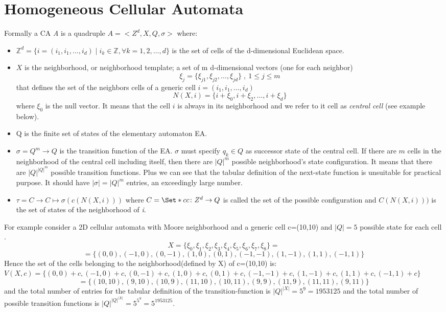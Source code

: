 \section{Homogeneous Cellular Automata}\label{homogeneousCellularAutomata}
Formally a CA \emph{A} is a quadruple $ A=<Z^d,X,Q,\sigma>$
where:
\begin{itemize}
  \item $\mathbb{Z}^d=\{i=(i_1,i_1,\ldots,i_d)\mid i_k \in
  \mathbb{Z}, \forall k=1,2,\ldots,d \}$ is the set of cells of the d-dimensional
   Euclidean space.
  \item $X$ is the neighborhood, or neighborhood template; a
  set of m d-dimensional vectors (one for each neighbor)
  \[\xi_j=\{\xi_{j1},\xi_{j2},\ldots,\xi_{jd}\} \;,\: 1\leq j \leq m\] that
  defines the set of the neighbors cells of a generic cell
  $i=(i_1,i_1,\ldots,i_d)$
  \[
  N(X,i)=\{i+\xi_0,i+\xi_2,\ldots,i+\xi_d\}
  \] where $\xi_0$ is the null vector. It means that the
  cell $i$ is always in its neighborhood and we refer to it
  cell as \emph{central cell}  (see example below).
\item Q is the finite set of states of the elementary automaton EA.
  
  \item $\sigma=Q^m \rightarrow Q $ is the transition
  function of the EA. $\sigma$ must specify
  $q_k \in Q $ as successor  state of the central cell.
  If there are $m$ cells in the neighborhood of the central
  cell including itself, then there are
  ${\left\vert{Q}\right\vert}^m$ possible neighborhood's
  state configuration. It  means that there are
  ${\left\vert{Q}\right\vert}^{{\left\vert{Q}\right\vert}^m}$
  possible transition functions. Plus we can see that the tabular definition of
  the next-state function is unsuitable for practical purpose. It should have
  $\left\vert{\sigma}\right\vert={\left\vert{Q}\right\vert}^m$
  entries, an exceedingly large number.
  \item $\tau=C \longrightarrow C \longmapsto
  \sigma(c(N(X,i)))$ where $C=\Set*{c}{c \colon Z^d
  \rightarrow Q}$ is called the set of the possible configuration and 
  $
  C(N(X,i)))$ is the set of states of the neighborhood of \textit{i}.
\end{itemize}




For example consider a 2D cellular automata with Moore neighborhood and a
generic cell c=(10,10) and ${\left\vert{Q}\right\vert}=5$
possible state for each cell .
\[X=\{\xi_{0},\xi_{1},\xi_{2},\xi_{3},\xi_{4},\xi_{5},\xi_{6},\xi_{7},\xi_{8}\}
=\]\[=\{(0,0),(-1,0),(0,-1),(1,0),(0,1),(-1,-1),(1,-1),(1,1),(-1,1)\}
\]
Hence the set of the cells belonging to the neighborhood(defined by X) of
c=(10,10) is:
$V(X,c)=\{(0,0)+c,(-1,0)+c,(0,-1)+c,(1,0)+c,(0,1)+c,(-1,-1)+c,(1,-1)+c,(1,1)+c,(-1,1)+c\}
$ 
\[=\{(10,10),(9,10),(10,9),(11,10),(10,11),(9,9),(11,9),(11,11),(9,11)\}
\]
and the total number of entries for the tabular definition of the
transition-function is  ${\left\vert{Q}\right\vert}^{\left\vert{X}\right\vert}=
5^9=1953125$ and the total number of possible transition functions
is
${\left\vert{Q}\right\vert}^{{\left\vert{Q}\right\vert}^{\left\vert{X}\right\vert}}=
5^{5^9}=5^{1953125}$.



